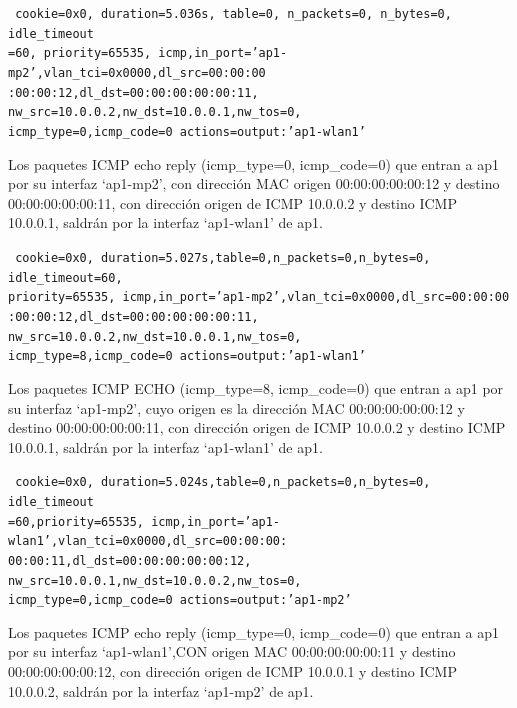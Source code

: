 \documentclass[a4paper,12pt,twoside,spanish]{book}
\begin{document}
\noindent\texttt{
	cookie=0x0, duration=5.036s, table=0, n\_packets=0, n\_bytes=0, idle\_timeout\\
	=60, priority=65535,
	icmp,in\_port='ap1-mp2',vlan\_tci=0x0000,dl\_src=00:00:00\\
	:00:00:12,dl\_dst=00:00:00:00:00:11,
	nw\_src=10.0.0.2,nw\_dst=10.0.0.1,nw\_tos=0,\\
	icmp\_type=0,icmp\_code=0 actions=output:'ap1-wlan1'
}

Los paquetes ICMP echo reply (icmp\_type=0, icmp\_code=0) que entran a ap1 por su interfaz ‘ap1-mp2’, con dirección MAC origen 00:00:00:00:00:12 y destino 00:00:00:00:00:11, con dirección origen de ICMP 10.0.0.2 y destino ICMP 10.0.0.1, saldrán por la interfaz ‘ap1-wlan1’ de ap1.\par 

\noindent\texttt{
	cookie=0x0, duration=5.027s,table=0,n\_packets=0,n\_bytes=0, idle\_timeout=60,\\
	priority=65535,
	icmp,in\_port='ap1-mp2',vlan\_tci=0x0000,dl\_src=00:00:00\\
	:00:00:12,dl\_dst=00:00:00:00:00:11,
	nw\_src=10.0.0.2,nw\_dst=10.0.0.1,nw\_tos=0,\\
	icmp\_type=8,icmp\_code=0 actions=output:'ap1-wlan1'
}

Los paquetes ICMP ECHO (icmp\_type=8, icmp\_code=0) que entran a ap1 por su interfaz ‘ap1-mp2’, cuyo origen es la dirección MAC 00:00:00:00:00:12 y destino 00:00:00:00:00:11, con dirección origen de ICMP 10.0.0.2 y destino ICMP 10.0.0.1, saldrán por la interfaz ‘ap1-wlan1’ de ap1.\par 

\noindent\texttt{
	cookie=0x0, duration=5.024s,table=0,n\_packets=0,n\_bytes=0, idle\_timeout\\
	=60,priority=65535,
	icmp,in\_port='ap1-wlan1',vlan\_tci=0x0000,dl\_src=00:00:00:\\
	00:00:11,dl\_dst=00:00:00:00:00:12,
	nw\_src=10.0.0.1,nw\_dst=10.0.0.2,nw\_tos=0,\\
	icmp\_type=0,icmp\_code=0 actions=output:'ap1-mp2'
}

Los paquetes ICMP echo reply (icmp\_type=0, icmp\_code=0) que entran a ap1 por su interfaz ‘ap1-wlan1’,CON origen MAC 00:00:00:00:00:11 y destino 00:00:00:00:00:12, con dirección origen de ICMP 10.0.0.1 y destino ICMP 10.0.0.2, saldrán por la interfaz ‘ap1-mp2’ de ap1.\par 

\hspace{1cm}
\end{document}
